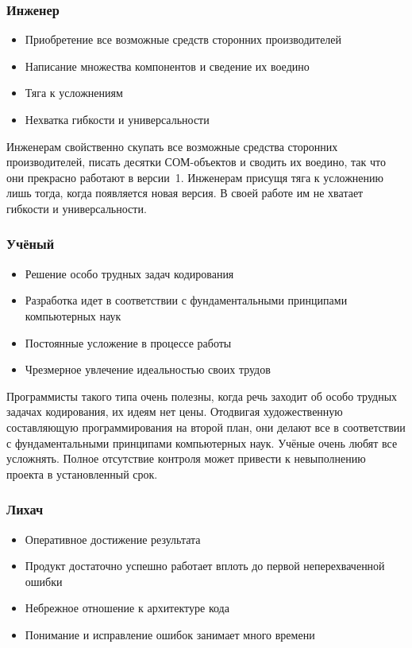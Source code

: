 \documentclass{../industrial-development}
\begin{document}
{\begin{frame} \frametitle{Инженер}
 \begin{itemize}
                     \item Приобретение все возможные средств сторонних производителей
		\item Написание множества компонентов и сведение их воедино
 		\item Тяга к усложнениям
 		\item Нехватка гибкости и универсальности
		\end{itemize}
\end{frame}
\lecturenotes
	Инженерам свойственно скупать все возможные средства сторонних производителей, писать десятки СОМ-объектов и сводить их воедино, так что они прекрасно работают в версии~1.
Инженерам присущя тяга к усложнению лишь тогда, когда появляется новая версия. В своей работе им не хватает гибкости и универсальности.

\begin{frame} \frametitle{Учёный}
 \begin{itemize}
		\item Решение особо трудных задач кодирования
                     \item Разработка идет в соответствии с фундаментальными принципами компьютерных наук
		\item Постоянные усложение в процессе работы
		\item Чрезмерное увлечение идеальностью своих трудов
		\end{itemize}
\end{frame}
\lecturenotes
	Программисты такого типа очень полезны, когда речь заходит об особо трудных задачах кодирования, их идеям нет цены. Отодвигая художественную составляющую программирования на второй план, они делают все в соответствии с фундаментальными принципами компьютерных наук.
	 Учёные очень любят все усложнять. Полное отсутствие контроля может привести к невыполнению проекта в установленный срок.

\begin{frame} \frametitle{Лихач}
	 \begin{itemize}
		\item Оперативное достижение результата 
		\item Продукт достаточно успешно работает вплоть до первой неперехваченной ошибки
                     \item Небрежное отношение к архитектуре кода
		\item Понимание и исправление ошибок занимает много времени
		 

\end{itemize}
\end{frame}}
\end{document}
